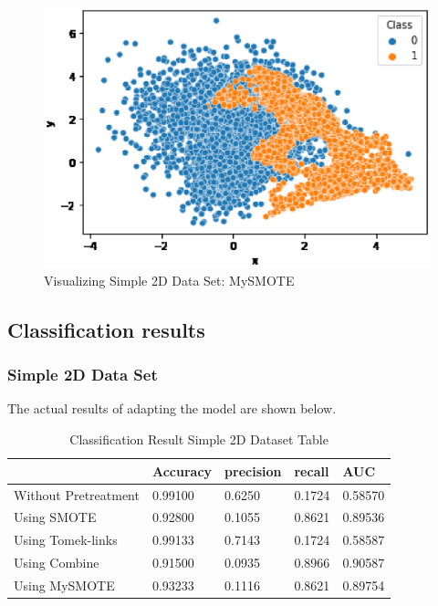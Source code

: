 \begin{center}
    \begin{figure}[ht]
        \caption{Visualizing Simple 2D Data Set: MySMOTE}
        \label{tab:team-rating-features}
        \begin{center}
            \includegraphics[scale=0.6]{image/mysmote.eps}
        \end{center}
    \end{figure}
\end{center}

\clearpage

\subsection{Classification results}
\subsubsection{Simple 2D Data Set}
The actual results of adapting the model are shown below.
\begin{table}[H]
    \caption{Classification Result Simple 2D Dataset Table}
    \centering
    \begin{tabular}{|l|l|l|l|l|}
    \hline
         & Accuracy & precision & recall & AUC \\ \hline
        Without Pretreatment & 0.99100 & 0.6250 & 0.1724 & 0.58570 \\ \hline
        Using SMOTE & 0.92800 & 0.1055 & 0.8621 & 0.89536 \\ \hline
        Using Tomek-links & 0.99133 & 0.7143 & 0.1724 & 0.58587 \\ \hline
        Using Combine & 0.91500 & 0.0935 & 0.8966 & 0.90587 \\ \hline
        Using MySMOTE & 0.93233 & 0.1116 & 0.8621 & 0.89754 \\ \hline
    \end{tabular}
\end{table}


